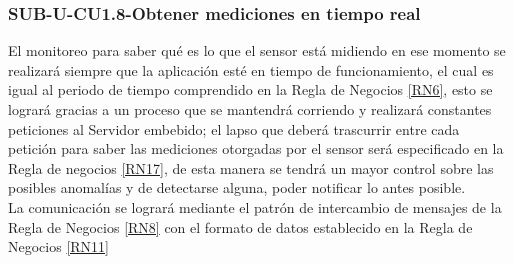 \subsubsection{SUB-U-CU1.8-Obtener mediciones en tiempo real}\label{SUB-U-CU1.8}
El monitoreo para saber qué es lo que el sensor está midiendo en ese momento se realizará siempre que la aplicación esté en tiempo de funcionamiento, el cual es igual al periodo de tiempo comprendido en la Regla de Negocios \ref{RN6}, esto se logrará gracias a un proceso que se mantendrá corriendo y realizará constantes peticiones al Servidor embebido; el lapso que deberá trascurrir entre cada petición para saber las mediciones otorgadas por el sensor será especificado en la Regla de negocios \ref{RN17}, de esta manera se tendrá un mayor control sobre las posibles anomalías y de detectarse alguna, poder notificar lo antes posible.
\\ La comunicación se logrará mediante el patrón de intercambio de mensajes de la Regla de Negocios \ref{RN8} con el formato de datos establecido en la Regla de Negocios \ref{RN11}  


